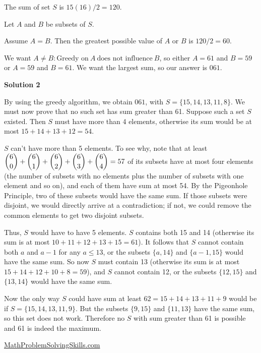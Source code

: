 \begin{enumerate}
The sum of set \( S \) is \( 15(16)/2 = 120 \).

 Let \( A \) and \( B \) be subsets of \( S \).

 Assume \( A = B \). Then the greatest possible value of \( A \) or \( B \) is \( 120/2 = 60 \).

 We want \( A \neq B : \text{Greedy on}~ A ~\text{does not influence}~ B\), so either \( A = 61 \) and \( B = 59 \) or \( A = 59 \) and \( B=61 \). We want the largest sum, so our answer is $\boxed{061}$.

 



\textbf{Solution 2}

By using the greedy algorithm, we obtain $\boxed{061}$, with $S=\{ 15,14,13,11,8\}$. We must now prove that no such set has sum greater than 61. Suppose such a set $S$ existed. Then $S$ must have more than 4 elements, otherwise its sum would be at most $15+14+13+12=54$.  

 $S$ can't have more than 5 elements. To see why, note that at least $\dbinom{6}{0} + \dbinom{6}{1} + \dbinom{6}{2} + \dbinom{6}{3} + \dbinom{6}{4}=57$ of its subsets have at most four elements (the number of subsets with no elements plus the number of subsets with one element and so on), and each of them have sum at most 54. By the Pigeonhole Principle, two of these subsets would have the same sum. If those subsets were disjoint, we would directly arrive at a contradiction; if not, we could remove the common elements to get two disjoint subsets.

 Thus, $S$ would have to have 5 elements. $S$ contains both 15 and 14 (otherwise its sum is at most $10+11+12+13+15=61$). It follows that $S$ cannot contain both $a$ and $a-1$ for any $a\leq 13$, or the subsets $\{a,14\}$ and $\{a-1,15\}$ would have the same sum. So now $S$ must contain 13 (otherwise its sum is at most $15+14+12+10+8=59$), and $S$ cannot contain 12, or the subsets $\{12,15\}$ and $\{13,14\}$ would have the same sum.

 Now the only way $S$ could have sum at least $62=15+14+13+11+9$ would be if $S=\{ 15,14,13,11,9\}$. But the subsets $\{9,15\}$ and $\{11,13\}$ have the same sum, so this set does not work. Therefore no $S$ with sum greater than 61 is possible and 61 is indeed the maximum.

 


 \href{https://mathproblemsolvingskills.wordpress.com/}{MathProblemSolvingSkills.com}

 



\end{enumerate}
